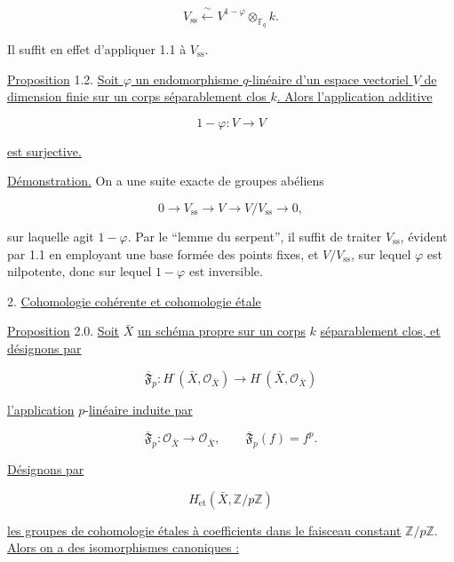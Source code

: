 \begin{equation}\tag{1.1.11}
V_{\mathrm{ss}}\xleftarrow{\ \sim\ }
V^{1-\varphi}\otimes_{\mathbb F_q}k.
\end{equation}

Il suffit en effet d'appliquer 1.1 à $V_{\mathrm{ss}}$.

\underline{Proposition} 1.2. \underline{Soit $\varphi$ un endomorphisme
$q$-linéaire d'un espace vectoriel $V$ de dimension finie sur un corps
séparablement clos $k$. Alors l'application additive}

\[
1-\varphi:V\longrightarrow V
\]

\underline{est surjective.}

\underline{Démonstration.} On a une suite exacte de groupes abéliens

\[
0\longrightarrow V_{\mathrm{ss}}\longrightarrow V
\longrightarrow V/V_{\mathrm{ss}}\longrightarrow0,
\]


sur laquelle agit $1-\varphi$. Par le ``lemme du serpent'', il suffit de
traiter $V_{\mathrm{ss}}$, évident par 1.1 en employant une base formée des
points fixes, et $V/V_{\mathrm{ss}}$, sur lequel $\varphi$ est nilpotente,
donc sur lequel $1-\varphi$ est inversible.

2. \underline{Cohomologie cohérente et cohomologie étale}

\underline{Proposition} 2.0. \underline{Soit} $\bar X$ \underline{un schéma propre sur
un corps} $k$ \underline{séparablement clos, et désignons par}

\begin{equation}\tag{2.0.1}
\overline{\mathfrak F}_p:H^{\cdot}(\bar X,\mathcal O_{\bar X})
\longrightarrow H^{\cdot}(\bar X,\mathcal O_{\bar X})
\end{equation}

\underline{l'application} $p$-\underline{linéaire induite par}

\begin{equation}\tag{2.0.2}
\overline{\mathfrak F}_p:\mathcal O_{\bar X}\longrightarrow\mathcal O_{\bar X},
\qquad \overline{\mathfrak F}_p(f)=f^p.
\end{equation}

\underline{Désignons par}

\[
H^{\cdot}_{\mathrm{et}}(\bar X,\mathbb Z/p\mathbb Z)
\]

\underline{les groupes de cohomologie étales à coefficients dans le faisceau
constant} $\mathbb Z/p\mathbb Z$. \underline{Alors on a des isomorphismes canoniques :}

